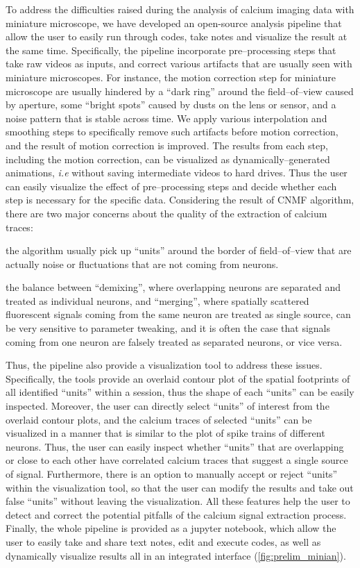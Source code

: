 \documentclass[master.tex]{subfiles}
\begin{document}
To address the difficulties raised during the analysis of calcium imaging data
with miniature microscope, we have developed an open-source analysis pipeline
that allow the user to easily run through codes, take notes and visualize the
result at the same time. Specifically, the pipeline incorporate pre--processing
steps that take raw videos as inputs, and correct various artifacts that are
usually seen with miniature microscopes. For instance, the motion correction
step for miniature microscope are usually hindered by a ``dark ring'' around the
field--of--view caused by aperture, some ``bright spots'' caused by dusts on the
lens or sensor, and a noise pattern that is stable across time. We apply various
interpolation and smoothing steps to specifically remove such artifacts before
motion correction, and the result of motion correction is improved. The results
from each step, including the motion correction, can be visualized as
dynamically--generated animations, \textit{i.e} without saving intermediate
videos to hard drives. Thus the user can easily visualize the effect of
pre--processing steps and decide whether each step is necessary for the specific
data. Considering the result of CNMF algorithm, there are two major concerns
about the quality of the extraction of calcium traces:
\begin{inparaenum}[a)]
\item the algorithm usually pick up ``units'' around the border of
  field--of--view that are actually noise or fluctuations that are not coming
  from neurons.
\item the balance between ``demixing'', where overlapping neurons are separated
  and treated as individual neurons, and ``merging'', where spatially scattered
  fluorescent signals coming from the same neuron are treated as single source,
  can be very sensitive to parameter tweaking, and it is often the case that
  signals coming from one neuron are falsely treated as separated neurons, or
  vice versa.
\end{inparaenum}
Thus, the pipeline also provide a visualization tool to address these issues.
Specifically, the tools provide an overlaid contour plot of the spatial
footprints of all identified ``units'' within a session, thus the shape of each
``units'' can be easily inspected. Moreover, the user can directly select
``units'' of interest from the overlaid contour plots, and the calcium traces of
selected ``units'' can be visualized in a manner that is similar to the plot of
spike trains of different neurons. Thus, the user can easily inspect whether
``units'' that are overlapping or close to each other have correlated calcium
traces that suggest a single source of signal. Furthermore, there is an option
to manually accept or reject ``units'' within the visualization tool, so that
the user can modify the results and take out false ``units'' without leaving the
visualization. All these features help the user to detect and correct the
potential pitfalls of the calcium signal extraction process. Finally, the whole
pipeline is provided as a jupyter notebook, which allow the user to easily
take and share text notes, edit and execute codes, as well as dynamically
visualize results all in an integrated interface (\autoref{fig:prelim_minian}).
\end{document}
